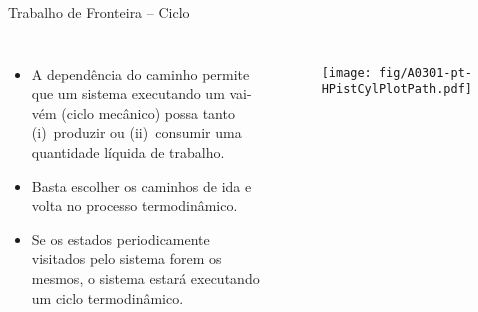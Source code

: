     \begin{frame}{Trabalho de Fronteira -- Ciclo}\vspace*{-2em}
        \begin{columns}
        \begin{itemize}
            \small
            \item<1-> A dependência do caminho permite que um sistema executando um vai-vém
                (\alert{ciclo mecânico}) possa tanto (i)~produzir ou (ii)~consumir uma
                quantidade \alert{líquida} de trabalho. \\[\medskipamount]
            \item<2-> Basta escolher os caminhos de ida e volta no processo termodinâmico.
                \\[\medskipamount]
            \item<3-> Se os \alert{estados} periodicamente visitados pelo sistema forem
                \alert{os mesmos}, o sistema estará executando um \alert{ciclo termodinâmico}.
        \end{itemize}
            \begin{figure}
                \texttt{[image: fig/A0301-pt-HPistCylPlotPath.pdf]}
            \end{figure}
        \end{columns}
    \end{frame}


